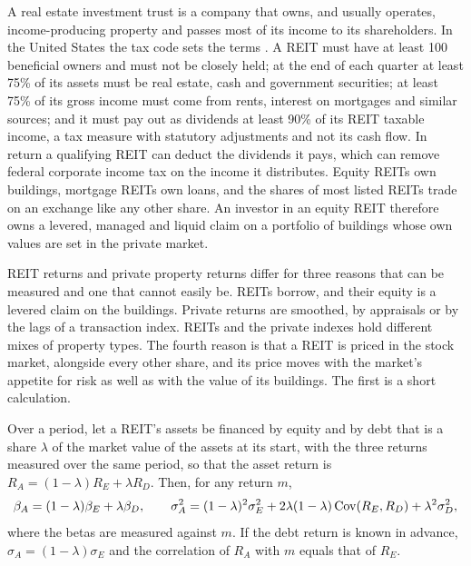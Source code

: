 \begin{chapterrefs}
A real estate investment trust is a company that owns, and usually operates, income-producing property
and passes most of its income to its shareholders. In the United States the tax code sets the terms
\parencite{usc856}. A REIT must have at least 100 beneficial owners and must not be closely held; at the
end of each quarter at least 75\% of its assets must be real estate, cash and government securities; at
least 75\% of its gross income must come from rents, interest on mortgages and similar sources; and it
must pay out as dividends at least 90\% of its REIT taxable income, a tax measure with statutory
adjustments and not its cash flow. In return a qualifying REIT can deduct the dividends it pays, which
can remove federal corporate income tax on the income it distributes. Equity REITs own buildings, mortgage REITs own loans, and the shares of most
listed REITs trade on an exchange like any other share. An investor in an equity REIT therefore owns a
levered, managed and liquid claim on a portfolio of buildings whose own values are set in the private
market.

REIT returns and private property returns differ for three reasons that can be measured and one that
cannot easily be. REITs borrow, and their equity is a levered claim on the buildings. Private returns
are smoothed, by appraisals or by the lags of a transaction index. REITs and the private indexes
hold different mixes of property types. The fourth
reason is that a REIT is priced in the stock market, alongside every other share, and its price moves
with the market's appetite for risk as well as with the value of its buildings. The first is a short
calculation.

\begin{proposition}\label{prop10:unlever}
Over a period, let a REIT's assets be financed by equity and by debt that is a share $\lambda$ of the
market value of the assets at its start, with the three returns measured over the same period, so that the asset return is $R_A=(1-\lambda)R_E+\lambda R_D$. Then, for any return $m$,
\[
  \beta_A=(1-\lambda)\beta_E+\lambda\beta_D,\qquad
  \sigma_A^2=(1-\lambda)^2\sigma_E^2+2\lambda(1-\lambda)\operatorname{Cov}(R_E,R_D)+\lambda^2\sigma_D^2,
\]
where the betas are measured against $m$. If the debt return is known in advance, $\sigma_A=(1-\lambda)\sigma_E$
and the correlation of $R_A$ with $m$ equals that of $R_E$.
\end{proposition}


\end{chapterrefs}

